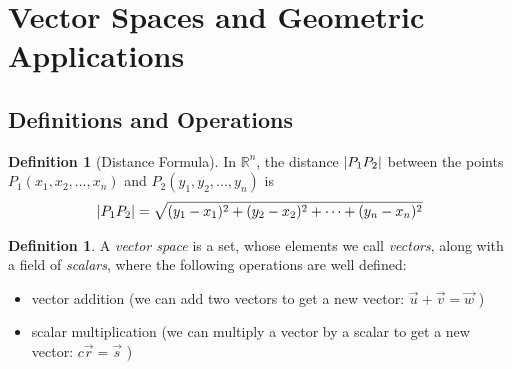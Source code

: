 \documentclass{article}[11pt]
\theoremstyle{definition}
\newtheorem{definition}[theorem]{Definition}
\DeclarePairedDelimiter\abs{\lvert}{\rvert}
\numberwithin{equation}{section}
\begin{document}
\thispagestyle{fancy}
\fancyhf{} %
\renewcommand{\headrulewidth}{0pt}


\setcounter{section}{0}
\section{Vector Spaces and Geometric Applications}
\subsection{Definitions and Operations}
\begin{definition}[Distance Formula]
	In \(\mathbb{R}^n\), the distance \(\abs*{P_1P_2}\) between the points \( P_1(x_1,x_2,...,x_n) \) and \(P_2(y_1,y_2,...,y_n)\) is
	\begin{align}
		\abs*{P_1 P_2}=\sqrt{(y_1-x_1)^2+(y_2-x_2)^2+\cdots+(y_n-x_n)^2} \label{eqn: the distance formula in R^n}
	\end{align}
\end{definition}

\begin{definition}
	A \emph{vector space} is a set, whose elements we call \emph{vectors}, along with a field of \emph{scalars}, where the following operations are well defined:
	\begin{itemize}
		\item vector addition (we can add two vectors to get a new vector: \( \vec{u}+\vec{v}=\vec{w} \) )
		\item scalar multiplication (we can multiply a vector by a scalar to get a new vector: \( c\vec{r}=\vec{s} \) )
	\end{itemize}
\end{definition}
\end{document}
